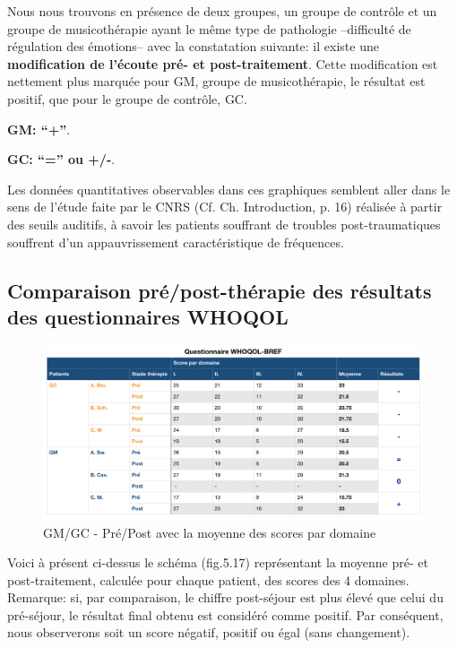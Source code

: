              Nous nous trouvons
           en présence de deux groupes, un groupe de contrôle et un
           groupe de musicothérapie ayant le même type de
           pathologie --difficulté de régulation des émotions-- avec la constatation suivante: il existe 
          une \textbf{modification de l'écoute pré- et post-traitement}.
          Cette modification est nettement plus marquée
          pour GM, groupe de musicothérapie, le résultat est positif, que pour le groupe de contrôle, GC.

          \textbf{GM: ``+''}.

          
          \textbf{GC:  ``='' ou +/-}.

          
        Les données quantitatives observables dans ces graphiques semblent aller dans le
sens de  l'étude faite par le
CNRS (Cf. Ch. Introduction, p. 16) \autocite{affectiveDisorders} réalisée à partir des seuils auditifs, à savoir
les patients souffrant de troubles post-traumatiques souffrent d'un
appauvrissement caractéristique de fréquences.


\subsection{ Comparaison pré/post-thérapie des résultats des
  questionnaires WHOQOL}

\begin{figure}[tbh]
\centering
\includegraphics[width=1.2\linewidth]{images/graphiques/questionnaire_wq.png}
\caption[Questionnaire WHOQOL-BREF]{GM/GC - Pré/Post avec la moyenne des scores par domaine}
       
\end{figure}
Voici à présent ci-dessus le schéma (fig.5.17) représentant la
moyenne pré- et post-traitement, calculée pour chaque patient, des scores
des 4 domaines.
Remarque: si, par comparaison, le chiffre post-séjour est plus élevé
que celui du
pré-séjour, le résultat final obtenu est considéré comme
positif. Par conséquent, nous
observerons soit un score négatif, positif ou égal (sans changement).


